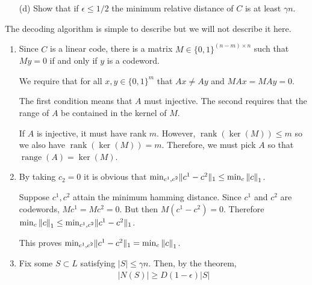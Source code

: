 \documentclass[10pt]{article}
\newcommand{\rank}{\operatorname{rank}}
\newcommand{\range}{\operatorname{range}}
\begin{document}
\begin{problem}[Problem 5]
\begin{enumerate}[label=(\alph*),nolistsep]
        \item[(d)] Show that if \( \epsilon\leq 1/2 \) the minimum relative distance of \( C \) is at least \( \gamma n \).
    \end{enumerate}
The decoding algorithm is simple to describe but we will not describe it here.
\end{problem}

\begin{solution}[Solution]
\begin{enumerate}[label=(\alph*)]
    \item Since \( C \) is a linear code, there is a matrix \( M\in \{0,1\}^{(n-m)\times n} \) such that \( My = 0 \) if and only if \( y \) is a codeword.

        We require that for all \( x,y\in\{0,1\}^m \) that \( Ax\neq Ay \) and \( MAx = MAy = 0 \).
        
        The first condition means that \( A \) must injective.
        The second requires that the range of \( A \) be contained in the kernel of \( M \). 
        
        If \( A \) is injective, it must have rank \( m \). However, \( \rank(\ker(M)) \leq m \) so we also have \( \rank(\ker(M)) = m \). Therefore, we must pick \( A \) so that \( \range(A) = \ker(M) \).
    \item 
        By taking \( c_2 = 0 \) it is obvious that \( \min_{c^1,c^2} \lVert c^1-c^2\rVert_1 \leq \min_c \left\lVert c\right\rVert_1 \).
        
        Suppose \( c^1,c^2 \) attain the minimum hamming distance. Since \( c^1 \) and \( c^2 \) are codewords, \( Mc^1 = Mc^2 = 0 \). But then \( M(c^1-c^2) = 0 \). Therefore \( \min_c \left\lVert c\right\rVert_1 \leq \min_{c^1,c^2} \lVert c^1-c^2\rVert_1  \).

        This proves \( \min_{c^1,c^2} \lVert c^1-c^2\rVert_1 = \min_c \left\lVert c\right\rVert_1 \).

    \item Fix some \( S\subset L \) satisfying \( |S| \leq \gamma n \). Then, by the theorem,
        \begin{align*}
            |N(S)| \geq D(1-\epsilon) |S|
        \end{align*}
        
\end{enumerate}
\end{solution}
\end{document}
